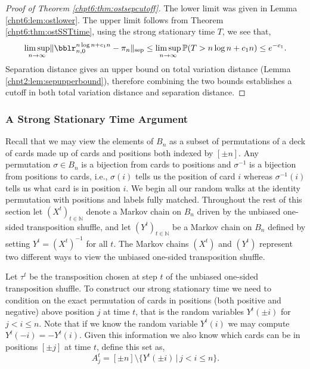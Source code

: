 \documentclass[11pt]{report}
\begin{document}
\begin{proof}[Proof of Theorem \ref{chpt6:thm:ostsepcutoff}]
	
	The lower limit was given in Lemma \ref{chpt6:lem:ostlower}. 
	The upper limit follows from  Theorem 
	\ref{chpt6:thm:ostSSTtime}, using the strong stationary time $T$, we see that,
	\[\limsup_{n\to\infty} \lVert \bblr_{n,0}^{n\log n +c_{1}n} 
	-\pi_{n} 
	\rVert_{\textnormal{sep}} \leq \limsup_{n\to\infty} 
	\mathbb{P}(T> n\log n + c_{1}n) \leq e^{-c_{1}} .\]
	Separation distance gives an upper bound on total variation distance (Lemma \ref{chpt2:lem:sepupperbound}), therefore combining the two bounds establishes a cutoff in both total variation distance and separation distance.
\end{proof}



\subsubsection{A Strong Stationary Time Argument}
Recall that we may view the elements of $B_{n}$ as a subset of permutations of a deck of cards made up of cards and positions both indexed by $[\pm n]$.
Any permutation $\sigma \in B_{n}$ is a bijection from cards to positions and $\sigma^{-1}$ is a bijection from positions to cards, i.e., $\sigma(i)$ tells us the position of card $i$ whereas $\sigma^{-1}(i)$ tells us what card is in position $i$.
We begin all our random walks at the identity permutation with positions and labels fully matched. 
Throughout the rest of this section let $(X^{t})_{t\in 	\mathbb{N}}$ denote a Markov chain on $B_{n}$ driven by the unbiased one-sided transposition shuffle, and let $(Y^{t})_{t \in \mathbb{N}}$ be a Markov chain on $B_{n}$ defined by setting $Y^{t} = (X^{t})^{-1}$ for all $t$. The Markov chains $(X^{t})$ and $(Y^{t})$ represent two different ways to view the unbiased one-sided transposition shuffle.  



Let $\tau^{t}$ be the transposition chosen at step $t$ of the unbiased one-sided transposition shuffle. 
To construct our strong stationary time we need to condition on the exact permutation of cards in positions (both positive and negative) above position $j$  at time $t$, that is the random variables $Y^{t}(\pm i)$ for $j< i  \leq n$. Note that if we know the random variable $Y^{t}(i)$ we may compute $Y^{t}(-i) = -Y^{t}(i)$.
Given this information we also know which cards can be in positions $[\pm j]$ at time $t$, define this set as, 
\[A_{j}^{t} = [\pm  n] \setminus \{ Y^{t}(\pm i)  \, | \, j < i \leq n\}.\]
\end{document}
